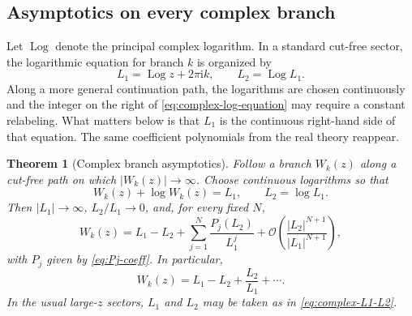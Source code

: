 \documentclass[11pt]{article}
\numberwithin{equation}{section}
\newtheorem{theorem}{Theorem}[section]
\theoremstyle{definition}
\theoremstyle{remark}
\newcommand{\ii}{\mathrm i}
\newcommand{\Log}{\operatorname{Log}}
\begin{document}
\subsection{Asymptotics on every complex branch}

Let $\Log$ denote the principal complex logarithm.  In a standard cut-free
sector, the logarithmic equation for branch $k$ is organized by
\begin{equation}
  L_1=\Log z+2\pi\ii k,
  \qquad
  L_2=\Log L_1.                                        \label{eq:complex-L1-L2}
\end{equation}
Along a more general continuation path, the logarithms are chosen
continuously and the integer on the right of
\eqref{eq:complex-log-equation} may require a constant relabeling.  What
matters below is that $L_1$ is the continuous right-hand side of that equation.
The same coefficient polynomials from the real theory reappear.

\begin{theorem}[Complex branch asymptotics]
\label{thm:complex-asymptotic}
Follow a branch $W_k(z)$ along a cut-free path on which
$|W_k(z)|\to\infty$.  Choose continuous logarithms so that
\begin{equation}
  W_k(z)+\log W_k(z)=L_1,
  \qquad L_2=\log L_1.                                 \label{eq:complex-continuous-L}
\end{equation}
Then $|L_1|\to\infty$, $L_2/L_1\to0$, and, for every fixed $N$,
\begin{equation}
 W_k(z)=L_1-L_2+\sum_{j=1}^{N}\frac{P_j(L_2)}{L_1^j}
 +\mathcal O\!\left(\frac{|L_2|^{N+1}}{|L_1|^{N+1}}\right),             \label{eq:complex-asymptotic}
\end{equation}
with $P_j$ given by \eqref{eq:Pj-coeff}.  In particular,
\[
  W_k(z)=L_1-L_2+\frac{L_2}{L_1}+\cdots.
\]
In the usual large-$z$ sectors, $L_1$ and $L_2$ may be taken as in
\eqref{eq:complex-L1-L2}.
\end{theorem}
\end{document}
